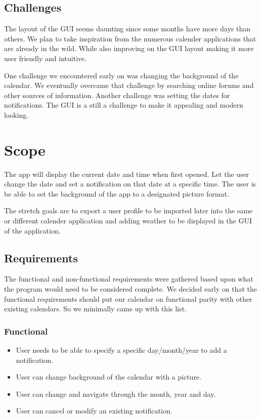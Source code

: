 \documentclass[10pt,conference,onecolumn,compsoc]{IEEEtran}
\begin{document}
\subsection{Challenges}
The layout of the GUI seems daunting since some months have more days than others. We plan to take inspiration from the numerous calender applications that are already in the wild. While also improving on the GUI layout making it more user friendly and intuitive.

One challenge we encountered early on was changing the background of the calendar. We eventually overcame that challenge by searching online forums and other sources of information. Another challenge was setting the dates for notifications. The GUI is a still a challenge to make it appealing and modern looking.

\section{Scope}
The app will display the current date and time when first opened. Let the user change the date and set a notification on that date at a specific time. The user is be able to set the background of the app to a designated picture format. 

The stretch goals are to export a user profile to be imported later into the same or different calender application and adding weather to be displayed in the GUI of the application.

\subsection{Requirements}
The functional and non-functional requirements were gathered based upon what the program would need to be considered complete. We decided early on that the functional requirements should put our calendar on functional parity with other existing calendars. So we minimally came up with this list.

\subsubsection{Functional}
\begin{itemize}
\item User needs to be able to specify a specific day/month/year to add a notification.
\item User can change background of the calendar with a picture.
\item User can change and navigate through the month, year and day.
\item User can cancel or modify an existing notification.
\end{itemize}
\end{document}
